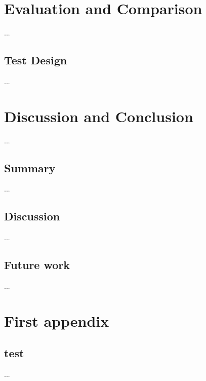 \chapter{Evaluation and Comparison}\label{c.evaluation}
...

\section{Test Design}\label{c.evaluation.test}
...

\chapter{Discussion and Conclusion}\label{c.conclusion}
...

\section{Summary}\label{c.conclusion.summary}
...

\section{Discussion}\label{c.conclusion.discussion}
...

\section{Future work}\label{c.conclusion.future}
...

% 
% 
% 
% 
% 



\appendix
\chapter{First appendix}

\section{test}
...

